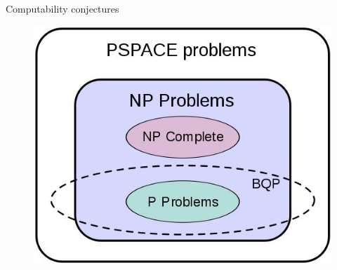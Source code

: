 \documentclass{beamer}
\begin{document}
\begin{frame}{Computability conjectures}
\begin{figure}
  \includegraphics[scale=.5]{pasted16}
\end{figure}
\end{frame}
\end{document}
